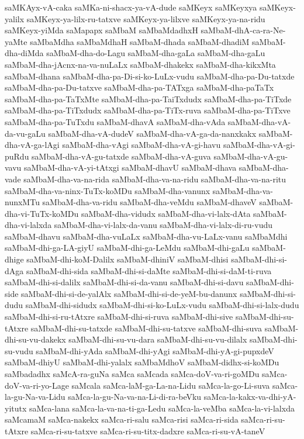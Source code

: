 {saMKAyx-vA-caka
saMKa-ni-shacx-ya-vA-dude
saMKeyx
saMKeyxya
saMKeyx-yalilx
saMKeyx-ya-lilx-ru-tatxve
saMKeyx-ya-lilxve
saMKeyx-ya-na-ridu
saMKeyx-yiMda
saMapapx
saMbaM
saMbaMdadhxH
saMbaM-dhA-ca-ra-Ne-yaMte
saMbaMdha
saMbaMdhaH
saMbaM-dhada
saMbaM-dhadiM
saMbaM-dha-diMda
saMbaM-dha-do-Lagu
saMbaM-dha-gaLa
saMbaM-dha-gaLu
saMbaM-dha-jAcnx-na-va-nuLaLx
saMbaM-dhakekx
saMbaM-dha-kikxMta
saMbaM-dhana
saMbaM-dha-pa-Di-si-ko-LuLx-vudu
saMbaM-dha-pa-Du-tatxde
saMbaM-dha-pa-Du-tatxve
saMbaM-dha-pa-TATxga
saMbaM-dha-paTaTx
saMbaM-dha-pa-TaTxMte
saMbaM-dha-pa-TaiTxdudx
saMbaM-dha-pa-TiTxde
saMbaM-dha-pa-TiTxdudx
saMbaM-dha-pa-TiTx-ruva
saMbaM-dha-pa-TiTxve
saMbaM-dha-pa-TuTxdu
saMbaM-dhavA
saMbaM-dha-vAda
saMbaM-dha-vA-da-vu-gaLu
saMbaM-dha-vA-dudeV
saMbaM-dha-vA-ga-da-nanxkakx
saMbaM-dha-vA-ga-lAgi
saMbaM-dha-vAgi
saMbaM-dha-vA-gi-havu
saMbaM-dha-vA-gi-puRdu
saMbaM-dha-vA-gu-tatxde
saMbaM-dha-vA-guva
saMbaM-dha-vA-gu-vavu
saMbaM-dha-vA-yi-tAtxgi
saMbaM-dhavU
saMbaM-dhava
saMbaM-dha-vade
saMbaM-dha-va-na-rida
saMbaM-dha-va-na-ridu
saMbaM-dha-va-na-ritu
saMbaM-dha-va-ninx-TuTx-koMDu
saMbaM-dha-vanunx
saMbaM-dha-va-nunxMTu
saMbaM-dha-va-ridu
saMbaM-dha-veMdu
saMbaM-dhaveV
saMbaM-dha-vi-TuTx-koMDu
saMbaM-dha-vidudx
saMbaM-dha-vi-lalx-dAta
saMbaM-dha-vi-lalxda
saMbaM-dha-vi-lalx-da-vanu
saMbaM-dha-vi-lalx-di-ru-vudu
saMbaM-dhavu
saMbaM-dha-vuLaLx
saMbaM-dha-vu-LaLx-vanu
saMbaMdhi
saMbaM-dhi-ga-LA-giyU
saMbaM-dhi-ga-LeMdu
saMbaM-dhi-gaLu
saMbaM-dhige
saMbaM-dhi-koM-Dalilx
saMbaM-dhiniV
saMbaM-dhisi
saMbaM-dhi-si-dAga
saMbaM-dhi-sida
saMbaM-dhi-si-daMte
saMbaM-dhi-si-daM-ti-ruva
saMbaM-dhi-si-dalilx
saMbaM-dhi-si-da-vanu
saMbaM-dhi-si-davu
saMbaM-dhi-side
saMbaM-dhi-si-de-yalAlx
saMbaM-dhi-si-de-yeM-bu-danunx
saMbaM-dhi-si-dudu
saMbaM-dhi-sidudx
saMbaM-dhi-si-ko-LuLx-vudu
saMbaM-dhi-si-lalx-dudu
saMbaM-dhi-si-ru-tAtxre
saMbaM-dhi-si-ruva
saMbaM-dhi-sive
saMbaM-dhi-su-tAtxre
saMbaM-dhi-su-tatxde
saMbaM-dhi-su-tatxve
saMbaM-dhi-suva
saMbaM-dhi-su-vu-dakekx
saMbaM-dhi-su-vu-dara
saMbaM-dhi-su-vu-dilalx
saMbaM-dhi-su-vudu
saMbaM-dhi-yAda
saMbaM-dhi-yAgi
saMbaM-dhi-yA-gi-pupxdeV
saMbaM-dhiyU
saMbaM-dhi-yalalx
saMbaMdhoV
saMbaM-didhx-si-koMDu
saMbadadhx
saMcA-ra-guNa
saMca
saMcada
saMca-doV-va-ri-goMDu
saMca-doV-va-ri-yo-Lage
saMcala
saMca-laM-ga-La-na-Lidu
saMca-la-go-Li-suva
saMca-la-gu-Na-va-Lidu
saMca-la-gu-Na-va-na-Li-di-ra-beVku
saMca-la-kakx-va-dhi-yA-yitutx
saMca-lana
saMca-la-va-na-ti-ga-Ledu
saMca-la-veMba
saMca-la-vi-lalxda
saMcamaM
saMca-nakekx
saMca-ri-salu
saMca-risi
saMca-ri-sida
saMca-ri-su-tAtxre
saMca-ri-su-tatxve
saMca-ri-su-titx-dadxre
saMca-ri-su-vA-taneV
}
